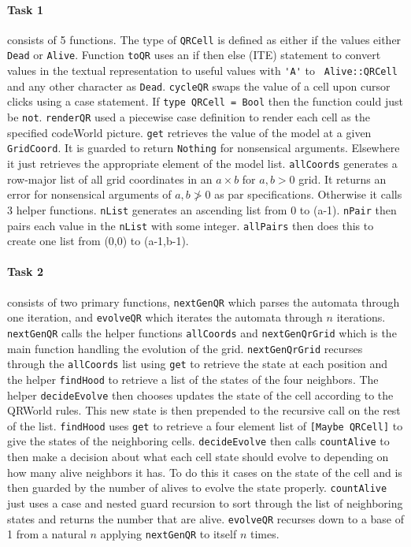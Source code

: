 \documentclass[11pt]{article}
\begin{document}
\paragraph{Task 1} consists of 5 functions. The type of \verb|QRCell| is defined as either if the values either \verb|Dead| or \verb|Alive|. Function \verb|toQR| uses an if then else (ITE) statement to convert values in the textual representation to useful values with \verb|'A'| to \verb| Alive::QRCell| and any other character as \verb|Dead|.  \verb|cycleQR| swaps the value of a cell upon cursor clicks using a case statement.  If \verb|type QRCell = Bool| then the function could just be \verb|not|. \verb|renderQR| used a piecewise case definition to render each cell as the specified codeWorld picture.  \verb|get| retrieves the value of the model at a given \verb|GridCoord|. It is guarded to return \verb|Nothing| for nonsensical arguments. Elsewhere it just retrieves the appropriate element of the model list. \verb|allCoords| generates a row-major list of all grid coordinates in an $a\times b$ for $a,b>0$ grid. It returns an error for nonsensical arguments of $a,b\not>0$ as par specifications. Otherwise it calls 3 helper functions. \verb|nList| generates an ascending list from 0 to (a-1). \verb|nPair| then pairs each value in the \verb|nList| with some integer. \verb|allPairs| then does this to create one list from (0,0) to (a-1,b-1). 

\paragraph{Task 2} consists of two primary functions, \verb|nextGenQR| which parses the automata through one iteration, and \verb|evolveQR| which iterates the automata through $n$ iterations. \verb|nextGenQR| calls the helper functions \verb|allCoords| and \verb|nextGenQrGrid| which is the main function handling the evolution of the grid.
\verb|nextGenQrGrid| recurses through the \verb|allCoords| list using \verb|get| to retrieve the state at each position and the helper \verb|findHood| to retrieve a list of the states of the four neighbors. The helper \verb|decideEvolve| then chooses updates the state of the cell according to the QRWorld rules. This new state is then prepended to the recursive call on the rest of the list.
\verb|findHood| uses \verb|get| to retrieve a four element list of \verb|[Maybe QRCell]| to give the states of the neighboring cells. \verb|decideEvolve| then calls \verb|countAlive| to then make a decision about what each cell state should evolve to depending on how many alive neighbors it has. To do this it cases on the state of the cell and is then guarded by the number of alives to evolve the state properly. \verb|countAlive| just uses a case and nested guard recursion to sort through the list of neighboring states and returns the number that are alive. \verb|evolveQR| recurses down to a base of 1 from a natural $n$ applying \verb|nextGenQR| to itself $n$ times.
\end{document}
